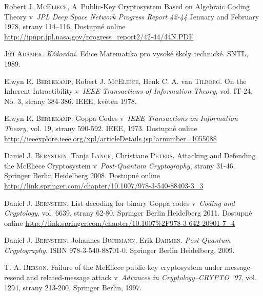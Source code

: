 \documentclass[thesis=M,czech,hidelinks]{FITthesis}[2012/06/26]
\newcommand{\0}{{\textcolor[gray]{0.75}{0}}}
\begin{document}
%
%
\begin{thebibliography}{99}

        Robert J. \textsc{McEliece}, A~Public-Key Cryptosystem Based on
        Algebraic Coding Theory v~\emph{JPL Deep Space Network Progress Report
        42-44} Jenuary and February 1978, strany 114–116. Dostupné online
        \url{http://ipnpr.jpl.nasa.gov/progress_report2/42-44/44N.PDF}

        Jiří \textsc{Adámek}. \emph{Kódování}. Edice Matematika pro vysoké školy
        technické. SNTL, 1989.

        Elwyn R. \textsc{Berlekamp}, Robert J. \textsc{McEliece}, Henk C. A. van
        \textsc{Tilborg}.  On the Inherent Intractibility v~\emph{IEEE
        Transactions of Information Theory}, vol. IT-24, No. 3, strany 384-386.
        IEEE, květen 1978.

        Elwyn R. \textsc{Berlekamp}. Goppa Codes v~\emph{IEEE Transactions on
        Information Theory}, vol. 19, strany 590-592. IEEE, 1973. Dostupné
        online
        \url{http://ieeexplore.ieee.org/xpl/articleDetails.jsp?arnumber=1055088}

        Daniel J. \textsc{Bernstein}, Tanja \textsc{Lange}, Christiane
        \textsc{Peters}. Attacking and Defending the McEliece Cryptosystem
        v~\emph{Post-Quantum Cryptography}, strany 31-46. Springer Berlin
        Heidelberg 2008. Dostupné online
        \url{http://link.springer.com/chapter/10.1007/978-3-540-88403-3\_3}

        Daniel J. \textsc{Bernstein}. List decoding for binary Goppa codes
        v~\emph{Coding and Cryptology}, vol. 6639, strany 62-80. Springer Berlin
        Heidelberg 2011. Dostupné online
        \url{http://link.springer.com/chapter/10.1007\%2F978-3-642-20901-7\_4}

        Daniel J. \textsc{Bernstein}, Johannes \textsc{Buchmann}, Erik
        \textsc{Dahmen}. \emph{Post-Quantum Cryptography}. ISBN
        978-3-540-88701-0.  Springer Berlin Heidelberg, 2009.

        T. A. \textsc{Berson}. Failure of the McEliece public-key cryptosystem under
        message-resend and related-message attack v~\emph{Advances in
        Cryptology–CRYPTO ’97}, vol. 1294, strany 213-200, Springer Berlin, 1997.


\end{thebibliography}
\end{document}
